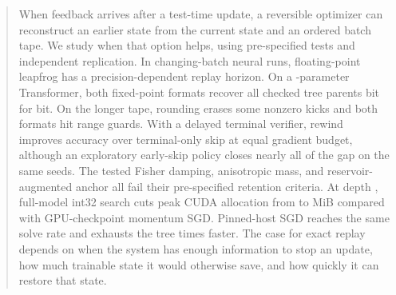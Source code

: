 \begin{abstract}
When feedback arrives after a test-time update, a reversible optimizer
can reconstruct an earlier state from the current state and an ordered
batch tape. We study when that option helps, using pre-specified tests
and independent replication. In changing-batch neural runs, floating-point
leapfrog has a precision-dependent replay horizon. On a
\PthreeParams{}-parameter Transformer, both fixed-point formats recover
all \PthreeParents{} checked tree parents bit for bit. On the longer tape,
rounding erases some nonzero kicks and both formats hit range guards.
With a delayed terminal verifier, rewind improves accuracy over
terminal-only skip at equal gradient budget, although an exploratory
early-skip policy closes nearly all of the gap on the same seeds.
The tested Fisher damping, anisotropic mass, and reservoir-augmented
anchor all fail their pre-specified retention criteria. At depth
\PthreeDepth{}, full-model int32 search cuts peak CUDA allocation from
\PthreeGpuSgdMiB{} to \PthreeIntLowMiB{} MiB compared with GPU-checkpoint
momentum SGD. Pinned-host SGD reaches the same solve rate and exhausts
the tree \PthreePinnedSpeedup{} times faster. The case for exact replay
depends on when the system has enough information to stop an update,
how much trainable state it would otherwise save, and how quickly it can
restore that state.
\end{abstract}
